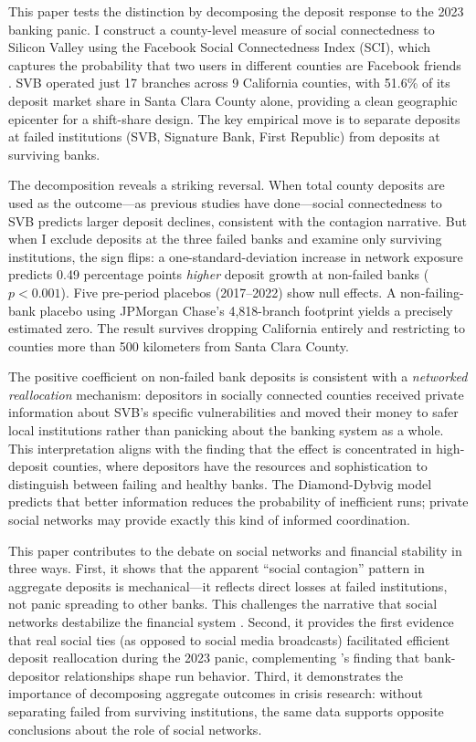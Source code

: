 \documentclass[12pt]{article}
\begin{document}
This paper tests the distinction by decomposing the deposit response to the 2023 banking panic. I construct a county-level measure of social connectedness to Silicon Valley using the Facebook Social Connectedness Index (SCI), which captures the probability that two users in different counties are Facebook friends \citep{Baileyetal2018}. SVB operated just 17 branches across 9 California counties, with 51.6\% of its deposit market share in Santa Clara County alone, providing a clean geographic epicenter for a shift-share design. The key empirical move is to separate deposits at failed institutions (SVB, Signature Bank, First Republic) from deposits at surviving banks.

The decomposition reveals a striking reversal. When total county deposits are used as the outcome---as previous studies have done---social connectedness to SVB predicts larger deposit declines, consistent with the contagion narrative. But when I exclude deposits at the three failed banks and examine only surviving institutions, the sign flips: a one-standard-deviation increase in network exposure predicts 0.49 percentage points \textit{higher} deposit growth at non-failed banks ($p < 0.001$). Five pre-period placebos (2017--2022) show null effects. A non-failing-bank placebo using JPMorgan Chase's 4,818-branch footprint yields a precisely estimated zero. The result survives dropping California entirely and restricting to counties more than 500 kilometers from Santa Clara County.

The positive coefficient on non-failed bank deposits is consistent with a \textit{networked reallocation} mechanism: depositors in socially connected counties received private information about SVB's specific vulnerabilities and moved their money to safer local institutions rather than panicking about the banking system as a whole. This interpretation aligns with the finding that the effect is concentrated in high-deposit counties, where depositors have the resources and sophistication to distinguish between failing and healthy banks. The Diamond-Dybvig model \citep{DiamondDybvig1983} predicts that better information reduces the probability of inefficient runs; private social networks may provide exactly this kind of informed coordination.

This paper contributes to the debate on social networks and financial stability in three ways. First, it shows that the apparent ``social contagion'' pattern in aggregate deposits is mechanical---it reflects direct losses at failed institutions, not panic spreading to other banks. This challenges the narrative that social networks destabilize the financial system \citep{Cooksonetal2023, Goldstein2005}. Second, it provides the first evidence that real social ties (as opposed to social media broadcasts) facilitated efficient deposit reallocation during the 2023 panic, complementing \citet{IyerPuri2012}'s finding that bank-depositor relationships shape run behavior. Third, it demonstrates the importance of decomposing aggregate outcomes in crisis research: without separating failed from surviving institutions, the same data supports opposite conclusions about the role of social networks.
\end{document}
